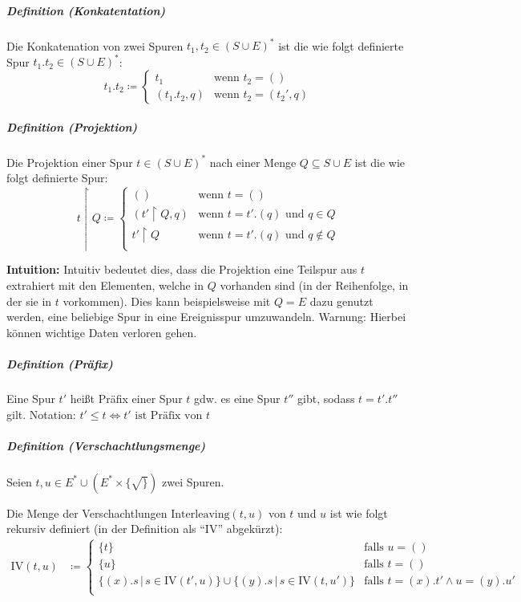 \documentclass[a4paper, 11pt, accentcolor = tud3b]{tudreport}
\newcommand{\forwhich}{\ensuremath{{\,\vert\,}}}
\newcommand{\subsubparagraph}[1]{\hspace{1cm} \textbf{#1:}}
\newcommand{\definition}[2]{\subparagraph{Definition (#1)} #2}
\newcommand{\intuition}[1]{\subsubparagraph{Intuition} #1}
\begin{document}
			    \definition{Konkatentation}{
			    	Die Konkatenation von zwei Spuren $ t _ 1, t _ 2 \in (S \cup E) ^ * $ ist die wie folgt definierte Spur $ t _ 1 . t _ 2 \in (S \cup E) ^ * $:
			    	\begin{equation*}
				    	t _ 1 . t _ 2 \coloneqq \begin{cases}
					    	t _ 1 & \text{wenn } t _ 2 = () \\
					    	(t _ 1 . t _ 2, q) & \text{wenn } t _ 2 = (t _ 2 ', q)
				    	\end{cases}
			    	\end{equation*}
			    }
			    
			    \definition{Projektion}{
			    	Die Projektion einer Spur $ t \in (S \cup E) ^ * $ nach einer Menge $ Q \subseteq S \cup E $ ist die wie folgt definierte Spur:
			    	\begin{equation*}
				    	t \upharpoonright Q \coloneqq \begin{cases}
					    	() & \text{wenn } t = () \\
					    	(t' \upharpoonright Q, q) & \text{wenn } t = t'.(q) \text{ und } q \in Q \\
					    	t' \upharpoonright Q & \text{wenn } t = t'.(q) \text{ und } q \not\in Q \\
				    	\end{cases}
			    	\end{equation*}
			    	
			    	\intuition{Intuitiv bedeutet dies, dass die Projektion eine Teilspur aus $ t $ extrahiert mit den Elementen, welche in $ Q $ vorhanden sind (in der Reihenfolge, in der sie in $ t $ vorkommen). Dies kann beispielsweise mit $ Q = E $ dazu genutzt werden, eine beliebige Spur in eine Ereignisspur umzuwandeln. Warnung: Hierbei können wichtige Daten verloren gehen.}
			    }
			    
			    \definition{Präfix}{
				    Eine Spur $ t' $ heißt Präfix einer Spur $ t $ gdw. es eine Spur $ t'' $ gibt, sodass $ t = t' . t'' $ gilt.
				    Notation: $ t' \leq t \iff t' \text{ ist Präfix von } t $
			    }
			    
			    \definition{Verschachtlungsmenge}{
			    	Seien $ t, u \in E ^ * \cup (E ^ * \times \{ \surd \}) $ zwei Spuren.
			    	
			    	Die Menge der Verschachtlungen $ \text{Interleaving}(t, u) $ von $ t $ und $ u $ ist wie folgt rekursiv definiert (in der Definition als \enquote{IV} abgekürzt):
			    	\begin{align*}
				    	\text{IV}(t, u) &\coloneqq \begin{cases}
					    	\{ t \} & \text{falls } u = () \\
					    	\{ u \} & \text{falls } t = () \\
					    	\{ (x).s \forwhich s \in \text{IV}(t', u) \} \cup \{ (y).s \forwhich s \in \text{IV}(t, u') \} & \text{falls } t = (x).t' \land u = (y).u' \\
				    	\end{cases}
			    	\end{align*}
			    }
			    
\end{document}
